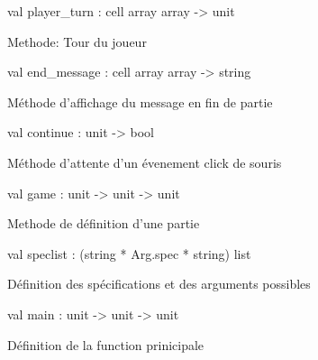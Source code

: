 \documentclass[11pt]{article}
\begin{document}
\label{val:Othello.player-underscoreturn}\begin{ocamldoccode}
val player_turn : cell array array -> unit
\end{ocamldoccode}
\begin{ocamldocdescription}
Methode: Tour du joueur


\end{ocamldocdescription}




\label{val:Othello.end-underscoremessage}\begin{ocamldoccode}
val end_message : cell array array -> string
\end{ocamldoccode}
\begin{ocamldocdescription}
Méthode d'affichage du message en fin de partie


\end{ocamldocdescription}




\label{val:Othello.continue}\begin{ocamldoccode}
val continue : unit -> bool
\end{ocamldoccode}
\begin{ocamldocdescription}
Méthode d'attente d'un évenement click de souris


\end{ocamldocdescription}




\label{val:Othello.game}\begin{ocamldoccode}
val game : unit -> unit -> unit
\end{ocamldoccode}
\begin{ocamldocdescription}
Methode de définition d'une partie


\end{ocamldocdescription}




\label{val:Othello.speclist}\begin{ocamldoccode}
val speclist : (string * Arg.spec * string) list
\end{ocamldoccode}
\begin{ocamldocdescription}
Définition des spécifications et des arguments possibles


\end{ocamldocdescription}




\label{val:Othello.main}\begin{ocamldoccode}
val main : unit -> unit -> unit
\end{ocamldoccode}
\begin{ocamldocdescription}
Définition de la function prinicipale


\end{ocamldocdescription}
\end{document}
